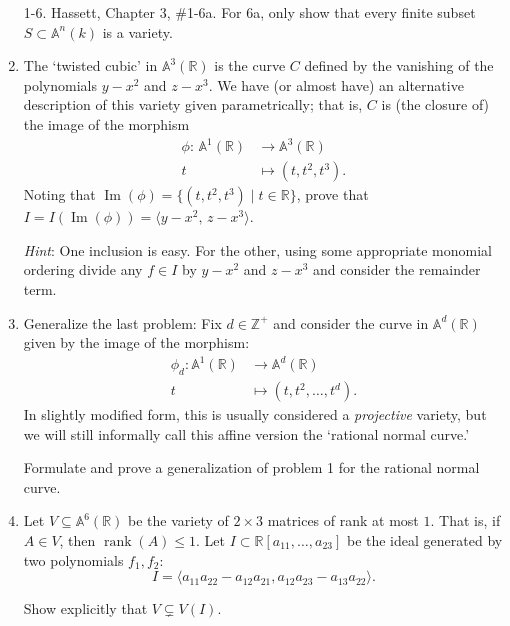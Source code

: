 \documentclass[11pt]{report}
\newcommand\RR{{\mathbb R}}
\newcommand\ZZ{{\mathbb Z}}
\newcommand\A{{\mathbb A}}
\newcommand\image{\operatorname{Im}}
\newcommand\rank{\operatorname{rank}}
\begin{document}
\enlargethispage{.5cm}


\vskip 1cm

\begin{enumerate}

\item[1-6.]  Hassett, Chapter 3, \#1-6a.  For 6a, only show that every finite subset $S \subset \A^n(k)$ is
a variety.

\setcounter{enumi}{6}

\item  The `twisted cubic' in $\A^3(\RR)$ is the curve $C$ defined by the vanishing
of the polynomials $y - x^2$ and $z - x^3$.  We have (or almost have) an
alternative description of this variety given parametrically; that is, $C$ is
(the closure of) the image of the morphism
\begin{align*}
\phi: \,  \A^1(\RR) &\to \A^3(\RR)\\
t &\mapsto (t, t^2,t^3).
\end{align*}
Noting that $\image (\phi) = \{(t, t^2, t^3) \mid t \in \RR\}$, prove that
$I = I (\image(\phi)) = \langle y - x^2, \, z-x^3 \rangle$.

\smallskip

\emph{Hint}:  One inclusion is easy.  For the other, using some
appropriate monomial ordering divide any $f \in I$ by
$y-x^2$ and $z-x^3$ and consider the remainder term.

\item Generalize the last problem:  Fix $d \in \ZZ^+$ and consider the curve
in $\A^d(\RR)$ given by the image of the morphism:
\begin{align*}
\phi_d : \A^1(\RR) &\to \A^d(\RR)\\
t &\mapsto (t, t^2, \dots, t^d).
\end{align*}
In slightly modified form, this is usually considered a \emph{projective} variety, but we will still
informally call this affine version the `rational normal curve.'

\smallskip

Formulate and prove a generalization of problem 1 for the rational normal curve.

\item Let $V \subseteq \A^6(\RR)$ be the variety of $2 \times 3$ matrices of rank at most $1$.  
That is,
if $A \in V$, then $\rank (A) \le 1$.  Let $I \subset \RR[a_{11}, \dots, a_{23}]$ be the ideal
generated by two polynomials $f_1, f_2$:
$$
I = \langle a_{11} a_{22} - a_{12} a_{21},  a_{12} a_{23} - a_{13} a_{22} \rangle.
$$

\smallskip

Show explicitly that $V \subsetneq V(I)$.

\end{enumerate}
\end{document}
